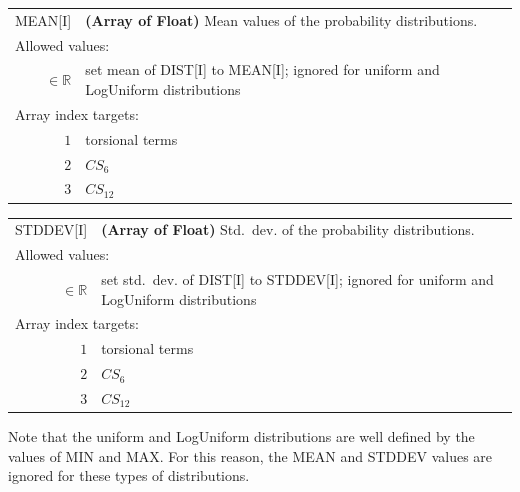 \documentclass[10pt,a4paper,openany]{memoir}
\numberwithin{equation}{section}
\begin{document}
{
\begin{tabular}{r@{ : }l}
\label{descr:mean}
      MEAN[I]&\textbf{(Array of Float)} Mean values of the probability distributions.                            \\ 
\multicolumn{2}{l}{Allowed values:} \\ 
\(\in\mathbb{R}\)&set mean of DIST[I] to MEAN[I]; ignored for uniform and LogUniform distributions                                                                       \\ 
\multicolumn{2}{l}{Array index targets:} \\ 
     \(1\)&torsional terms                                                                                      \\ 
     \(2\)&$CS_6$                                                                                               \\ 
     \(3\)&$CS_{12}$                                                                                            \\ 
\end{tabular}
\vspace{1ex}
}

{
\begin{tabular}{r@{ : }l}
\label{descr:stddev}
    STDDEV[I]&\textbf{(Array of Float)} Std.~dev. of the probability distributions.                              \\ 
\multicolumn{2}{l}{Allowed values:} \\ 
\(\in\mathbb{R}\)&set std.~dev. of DIST[I] to STDDEV[I]; ignored for uniform and LogUniform distributions                                                       \\ 
\multicolumn{2}{l}{Array index targets:} \\ 
     \(1\)&torsional terms                                                                                      \\ 
     \(2\)&$CS_6$                                                                                               \\ 
     \(3\)&$CS_{12}$                                                                                            \\ 
\end{tabular}
\vspace{1ex}
}

Note that the uniform and LogUniform distributions are well defined by
the values of MIN and MAX. For this reason, the MEAN and STDDEV values
are ignored for these types of distributions.
\end{document}
